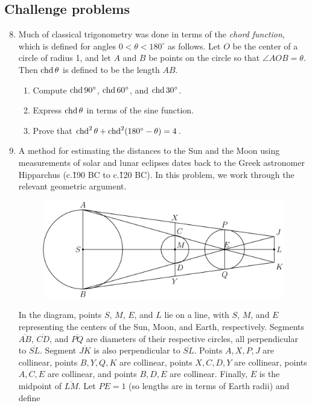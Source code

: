 \subsection{Challenge problems}

\begin{enumerate}\setcounter{enumi}{7}
\item Much of classical trigonometry was done in terms of the \emph{chord function}, which is defined for angles $0 < \theta < 180^{\circ}$ as follows. Let $O$ be the center of a circle of radius 1, and let $A$ and $B$ be points on the circle so that $\angle AOB = \theta$. Then $\operatorname{chd}\theta$ is defined to be the length $AB$.
\begin{enumerate}
\item Compute $\operatorname{chd} 90^{\circ}$, $\operatorname{chd} 60^{\circ}$, and $\operatorname{chd} 30^{\circ}$.
\item Express $\operatorname{chd}\theta$ in terms of the sine function.
\item Prove that $\operatorname{chd}^2\theta + \operatorname{chd}^2(180^{\circ} - \theta) = 4$.
\end{enumerate}\newpage
\item A method for estimating the distances to the Sun and the Moon using measurements of solar and lunar eclipses dates back to the Greek astronomer Hipparchus (c.\~190 BC to c.\~120 BC). In this problem, we work through the relevant geometric argument.
\begin{figure}[H]
\centering
\includegraphics[scale=0.4]{img-hipparchus-2.png}
\end{figure}
In the diagram, points $S$, $M$, $E$, and $L$ lie on a line, with $S$, $M$, and $E$ representing the centers of the Sun, Moon, and Earth, respectively. Segments $\overline{AB}$, $\overline{CD}$, and $\overline{PQ}$ are diameters of their respective circles, all perpendicular to $\overline{SL}$. Segment $\overline{JK}$ is also perpendicular to $\overline{SL}$. Points $A, X, P, J$ are collinear, points $B, Y, Q, K$ are collinear, points $X, C, D, Y$ are collinear, points $A, C, E$ are collinear, and points $B, D, E$ are collinear. Finally, $E$ is the midpoint of $\overline{LM}$. Let $PE = 1$ (so lengths are in terms of Earth radii) and define

\end{enumerate}
